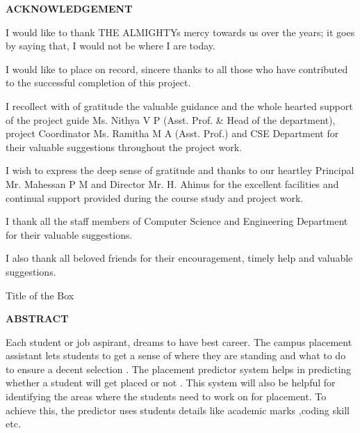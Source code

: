 \documentclass[12pt]{article}
\begin{document}
\newpage



\vspace*{50px}
\begin{center}\LARGE\bf{ACKNOWLEDGEMENT}\end{center}
\vspace{10px}
\thispagestyle{empty}

I would like to thank THE ALMIGHTYs mercy towards us over the years; it goes
by saying that, I would not be where I are today.

I would like to place on record, sincere thanks to all those who have contributed
to the successful completion of this project.

I recollect with of gratitude the valuable guidance and the whole hearted support
of the project guide Ms. Nithya V P (Asst. Prof. \&  Head of the department),  project Coordinator Ms. Ramitha M A (Asst. Prof.) and CSE Department for their valuable suggestions throughout the
project work.

I wish to express the deep sense of gratitude and thanks to our heartley Principal Mr.
Mahessan P M and Director Mr. H. Ahinus for the excellent facilities and continual
support provided during the course study and project work.

I thank all the staff members of Computer Science and Engineering Department
for their valuable suggestions.

I also thank all beloved friends for their encouragement, timely help and valuable suggestions.


\newpage
\begin{boxed}{Title of the Box}
\vspace*{50px}
\begin{center} \LARGE\bf{ABSTRACT} \end{center}
               
\vspace{30px}
Each student or job aspirant, dreams to have best career. The
campus placement assistant lets students to get a sense of
where they are standing and what to do to ensure a decent
selection .
The placement predictor system helps in predicting whether a
student will get placed or not .
 This system will also be helpful for identifying the areas where
the students need to work on for placement.
 To achieve this, the predictor uses students details like
academic marks ,coding skill etc. 

\newpage
\tableofcontents
\clearpage
\listoffigures

\clearpage


\end{boxed}
\end{document}
